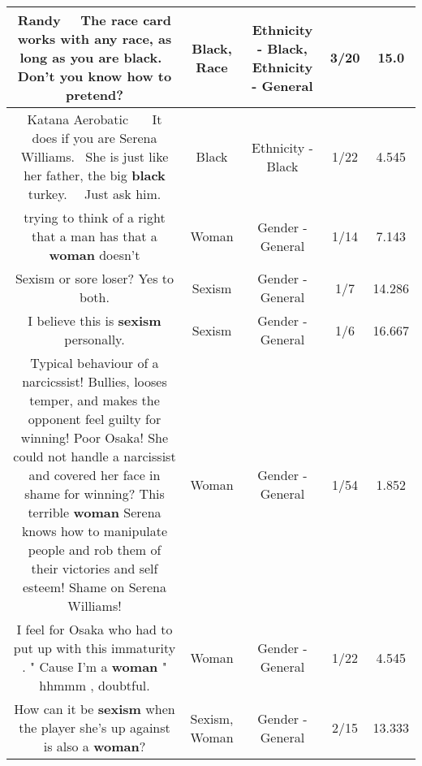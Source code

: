 \documentclass[11pt]{article}
\newlength\mylength
\begin{document}
\begin{center}
\begin{longtable}{|C{.65\mylength}|C{.30\mylength}|C{.12\mylength}|C{.12\mylength}|C{.12\mylength}|}
  \small Randy   The \textbf{race} card works with any \textbf{race}, as long as you are \textbf{black}.  Don't you know how to pretend?\normalsize   & Black, Race & Ethnicity - Black, Ethnicity - General & 3/20 & 15.0 \\  \hline
  \small Katana Aerobatic    It does if you are Serena Williams.  She is just like her father, the big \textbf{black} turkey.   Just ask him.\normalsize   & Black & Ethnicity - Black & 1/22 & 4.545 \\  \hline
  \small trying to think of a right that a man has that a \textbf{woman} doesn't\normalsize   & Woman & Gender - General & 1/14 & 7.143 \\  \hline
  \small Sexism or sore loser? Yes to both.\normalsize   & Sexism & Gender - General & 1/7 & 14.286 \\  \hline
  \small I believe this is \textbf{sexism} personally.\normalsize   & Sexism & Gender - General & 1/6 & 16.667 \\  \hline
  \small Typical behaviour of  a narcicssist! Bullies, looses temper, and makes the opponent feel guilty for winning! Poor Osaka! She could not handle a narcissist and covered her face in shame for winning? This terrible \textbf{woman} Serena knows how to manipulate people and rob them of their victories and self esteem! Shame on Serena Williams!\normalsize   & Woman & Gender - General & 1/54 & 1.852 \\  \hline
  \small I feel for Osaka who had to put up with this immaturity .   " Cause I'm a \textbf{woman} " hhmmm , doubtful.\normalsize   & Woman & Gender - General & 1/22 & 4.545 \\  \hline
  \small How can it be \textbf{sexism} when the player she's up against is also a \textbf{woman}?\normalsize   & Sexism, Woman & Gender - General & 2/15 & 13.333 \\  \hline

\end{longtable}
\end{center}
\end{document}
